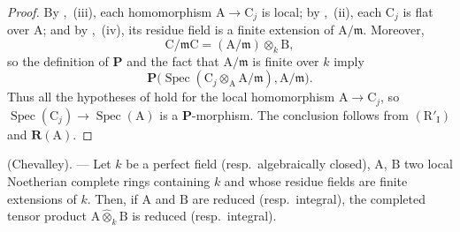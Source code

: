 \begin{proof}
By ,~(iii), each homomorphism $\mathrm{A}\to\mathrm{C}_j$ is local; by ,~(ii), each $\mathrm{C}_j$ is flat over $\mathrm{A}$; and by ,~(iv), its residue field is a finite extension of $\mathrm{A}/\mathfrak{m}$. Moreover,
\[
  \mathrm{C}/\mathfrak{m}\mathrm{C}
  =(\mathrm{A}/\mathfrak{m})\otimes_k\mathrm{B},
\]
so the definition of $\boldsymbol{P}$ and the fact that $\mathrm{A}/\mathfrak{m}$ is finite over $k$ imply
\[
  \boldsymbol{P}\bigl(\operatorname{Spec}(\mathrm{C}_j\otimes_\mathrm{A}\mathrm{A}/\mathfrak{m}),\mathrm{A}/\mathfrak{m}\bigr).
\]
Thus all the hypotheses of  hold for the local homomorphism $\mathrm{A}\to\mathrm{C}_j$, so $\operatorname{Spec}(\mathrm{C}_j)\to\operatorname{Spec}(\mathrm{A})$ is a $\boldsymbol{P}$-morphism. The conclusion follows from $(\mathrm{R}'_{\mathrm{I}})$ and $\boldsymbol{R}(\mathrm{A})$.
\end{proof}

\begin{corollary}[7.5.7]
\label{IV.7.5.7}
(Chevalley). --- Let $k$ be a perfect field (resp.\ algebraically closed), $\mathrm{A}$, $\mathrm{B}$ two local Noetherian complete rings containing $k$ and whose residue fields are finite extensions of $k$. Then, if $\mathrm{A}$ and $\mathrm{B}$ are reduced (resp.\ integral), the completed tensor product $\mathrm{A}\widehat{\otimes}_k\mathrm{B}$ is reduced (resp.\ integral).
\end{corollary}

